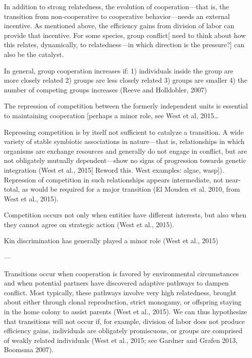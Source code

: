\documentclass{tufte-book} %
\begin{document}
In addition to strong relatedness, the evolution of cooperation—that is, the transition from non-cooperative to cooperative behavior—needs an external incentive. As mentioned above, the efficiency gains from division of labor can provide that incentive. For some species, group conflict[ need to think about how this relates, dynamically, to relatedness—in which direction is the pressure?] can also be the catalyst. 

In general, group cooperation increases if:
1) individuals inside the group are more closely related
2) groups are less closely related
3) groups are smaller
4) the number of competing groups increases (Reeve and Holldobler, 2007)

The repression of competition between the formerly independent units is essential to maintaining cooperation [perhaps a minor role, see West et al, 2015…

Repressing competition is by itself not sufficient to catalyze a transition. A wide variety of stable symbiotic associations in nature—that is, relationships in which organisms are exchange resources and generally do not engage in conflict, but are not obligately mutually dependent—show no signs of progression towards genetic integration (West et al., 2015[ Reword this. West examples: algae, wasp]). Repression of competition in such relationships appears intermediate, not near-total, as would be required for a major transition (El Mouden et al. 2010, from West et al., 2015). 

Competition occurs not only when entities have different interests, but also when they cannot agree on strategic action (West et al., 2015).

Kin discrimination has generally played a minor role (West et al., 2015)

—

Transitions occur when cooperation is favored by environmental circumstances and when potential partners have discovered adaptive pathways to dampen conflict. Most typically, these pathways involve very high relatedness, brought about either through clonal reproduction, strict monogamy, or offspring staying in the home colony to assist parents (West et al., 2015). We can thus hypothesize that transitions will not occur if, for example, division of labor does not produce efficiency gains, individuals are obligately promiscuous, or groups are comprised of weakly related individuals (West et al., 2015; see Gardner and Grafen 2013, Boomsma 2007). 
\end{document}
